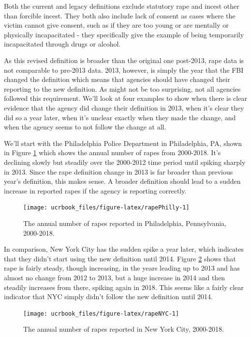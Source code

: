\documentclass[
  12pt,
  openany]{book}
\begin{document}
Both the current and legacy definitions exclude statutory rape and incest other than forcible incest. They both also include lack of consent as cases where the victim cannot give consent, such as if they are too young or are mentally or physically incapacitated - they specifically give the example of being temporarily incapacitated through drugs or alcohol.

As this revised definition is broader than the original one post-2013, rape data is not comparable to pre-2013 data. 2013, however, is simply the year that the FBI changed the definition which means that agencies should have changed their reporting to the new definition. As might not be too surprising, not all agencies followed this requirement. We'll look at four examples to show when there is clear evidence that the agency did change their definition in 2013, when it's clear they did so a year later, when it's unclear exactly when they made the change, and when the agency seems to not follow the change at all.

We'll start with the Philadelphia Police Department in Philadelphia, PA, shown in Figure \ref{fig:rapePhilly} which shows the annual number of rapes from 2000-2018. It's declining slowly but steadily over the 2000-2012 time period until spiking sharply in 2013. Since the rape definition change in 2013 is far broader than previous year's definition, this makes sense. A broader definition should lead to a sudden increase in reported rapes if the agency is reporting correctly.

\begin{figure}

{\centering \texttt{[image: ucrbook\_files/figure-latex/rapePhilly-1]} 

}

\caption{The annual number of rapes reported in Philadelphia, Pennsylvania, 2000-2018.}\label{fig:rapePhilly}
\end{figure}

In comparison, New York City has the sudden spike a year later, which indicates that they didn't start using the new definition until 2014. Figure \ref{fig:rapeNYC} shows that rape is fairly steady, though increasing, in the years leading up to 2013 and has almost no change from 2012 to 2013, but a huge increase in 2014 and then steadily increases from there, spiking again in 2018. This seems like a fairly clear indicator that NYC simply didn't follow the new definition until 2014.

\begin{figure}

{\centering \texttt{[image: ucrbook\_files/figure-latex/rapeNYC-1]} 

}

\caption{The annual number of rapes reported in New York City, 2000-2018.}\label{fig:rapeNYC}
\end{figure}
\end{document}
